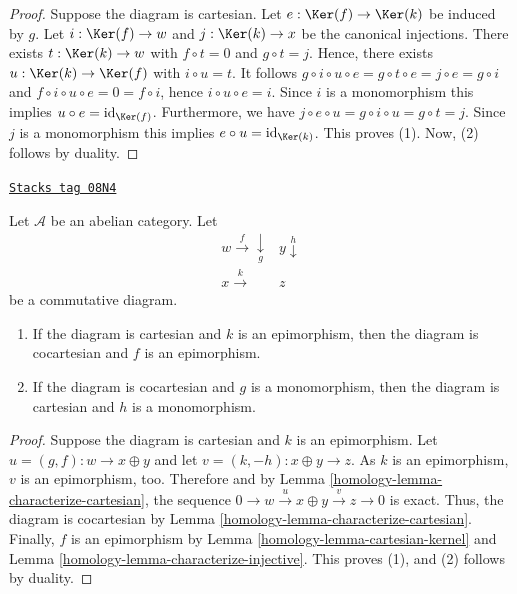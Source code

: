 \begin{proof}
Suppose the diagram is cartesian. Let
$e:\Ker(f)\to\Ker(k)$ be induced by $g$. Let
$i:\Ker(f)\to w$ and $j:\Ker(k)\to x$ be the canonical
injections. There exists $t:\Ker(k)\to w$ with $f\circ t=0$
and $g\circ t=j$. Hence, there exists $u:\Ker(k)\to\Ker(f)$
with $i\circ u=t$. It follows
$g\circ i\circ u\circ e=g\circ t\circ e=j\circ e=g\circ i$ and
$f\circ i\circ u\circ e=0=f\circ i$, hence $i\circ u\circ e=i$. Since
$i$ is a monomorphism this implies $u\circ e=\text{id}_{\Ker(f)}$.
Furthermore, we have $j\circ e\circ u=g\circ i\circ u=g\circ t=j$.
Since $j$ is a monomorphism this implies $e\circ u=\text{id}_{\Ker(k)}$.
This proves (1). Now, (2) follows by duality.
\end{proof}

\begin{lemma}
\label{homology-lemma-cartesian-cocartesian}
\href{https://stacks.math.columbia.edu/tag/08N4}{\texttt{Stacks tag 08N4}}

Let $\mathcal{A}$ be an abelian category. Let
$$
\begin{array}{cc}w\overset{f}{\longrightarrow}\underset{g}{\downarrow} & y\overset{h}{\downarrow} \\ x\overset{k}{\longrightarrow} & z\end{array}
$$
be a commutative diagram.
\begin{enumerate}
\item If the diagram is cartesian and $k$ is an epimorphism,
then the diagram is cocartesian and $f$ is an epimorphism.
\item If the diagram is cocartesian and $g$ is a monomorphism,
then the diagram is cartesian and $h$ is a monomorphism.
\end{enumerate}
\end{lemma}

\begin{proof}

Suppose the diagram is cartesian and $k$ is an epimorphism.
Let $u = (g, f) : w \to x \oplus y$ and let $v = (k, -h) : x \oplus y \to z$.
As $k$ is an epimorphism, $v$ is an epimorphism, too. Therefore
and by Lemma \ref{homology-lemma-characterize-cartesian}, the sequence
$0\to w\overset{u}\to x\oplus y\overset{v}\to z\to 0$ is exact. Thus, the
diagram is cocartesian by Lemma \ref{homology-lemma-characterize-cartesian}. Finally,
$f$ is an epimorphism by Lemma \ref{homology-lemma-cartesian-kernel} and
Lemma \ref{homology-lemma-characterize-injective}. This proves (1), and (2)
follows by duality.
\end{proof}

